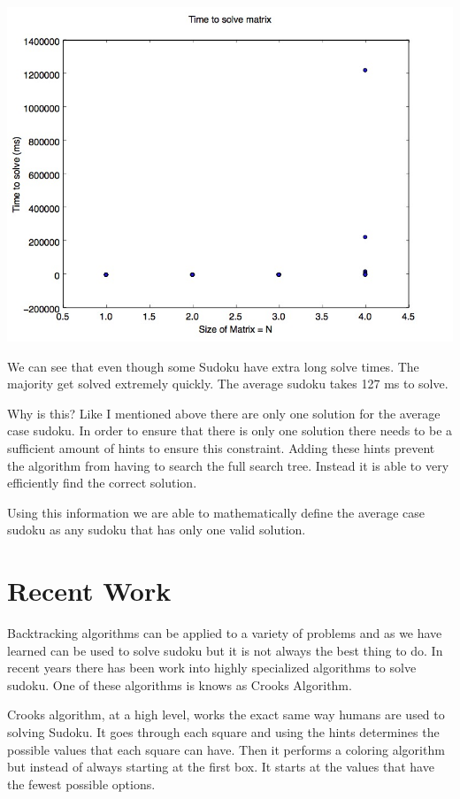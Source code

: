 \documentclass{sig-alternate}
\begin{document}
\includegraphics[width=\linewidth]{src/allN.jpg}

We can see that even though some Sudoku have extra long solve times. The majority get solved extremely quickly. The average sudoku takes 127 ms to solve. 

Why is this? Like I mentioned above there are only one solution for the average case sudoku. In order to ensure that there is only one solution there needs to be a sufficient amount of hints to ensure this constraint. Adding these hints prevent the algorithm from having to search the full search tree. Instead it is able to very efficiently find the correct solution. 

Using this information we are able to mathematically define the average case sudoku as any sudoku that has only one valid solution. 

\section{Recent Work}
Backtracking algorithms can be applied to a variety of problems and as we have learned can be used to solve sudoku but it is not always the best thing to do. In recent years there has been work into highly specialized algorithms to solve sudoku. One of these algorithms is knows as Crooks Algorithm.

Crooks algorithm, at a high level, works the exact same way humans are used to solving Sudoku. It goes through each square and using the hints determines the possible values that each square can have. Then it performs a coloring algorithm but instead of always starting at the first box. It starts at the values that have the fewest possible options. 
\cite{Crook2}
\end{document}
